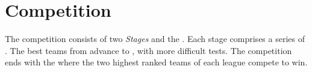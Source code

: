 \section{Competition}
The competition consists of two \emph{Stages} and the \FINAL{}. Each stage comprises a series of . The best teams from \SONE{} advance to \STWO{}, with more difficult tests. The competition ends with the \FINAL{} where the two highest ranked teams of each league compete to win.
